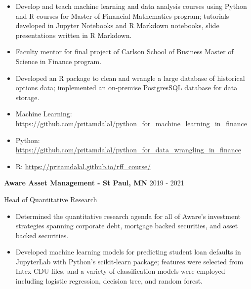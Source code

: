 \documentclass[11pt,a4paper,]{awesome-cv}
\begin{document}
\begin{itemize}
\item
  Develop and teach machine learning and data analysis courses using
  Python and R courses for Master of Financial Mathematics program;
  tutorials developed in Jupyter Notebooks and R Markdown notebooks,
  slide presentations written in R Markdown. \vspace{-0.5ex}
\item
  Faculty mentor for final project of Carlson School of Business Master
  of Science in Finance program. \vspace{-0.5ex}
\item
  Developed an R package to clean and wrangle a large database of
  historical options data; implemented an on-premise PostgresSQL
  database for data storage. \vspace{-0.5ex}
\item
  Machine Learning:
  \href{https://github.com/pritamdalal/python\_for\_machine\_learning\_in\_finance}{https://github.com/pritamdalal/python\_for\_machine\_learning\_in\_finance}
  \vspace{-0.5ex}
\item
  Python:
  \href{https://github.com/pritamdalal/python\_for\_data\_wrangling\_in\_finance}{https://github.com/pritamdalal/python\_for\_data\_wrangling\_in\_finance}
  \vspace{-0.5ex}
\item
  R:
  \href{https://pritamdalal.github.io/rff\_course/}{https://pritamdalal.github.io/rff\_course/}
  \vspace{-0.5ex}
\end{itemize}

\normalsize

\textbf{Aware Asset Management - St Paul, MN} \hfill 2019 - 2021

\vspace{-1ex}

Head of Quantitative Research

\vspace{-1.5ex}

\small

\begin{itemize}
\item
  Determined the quantitative research agenda for all of Aware's
  investment strategies spanning corporate debt, mortgage backed
  securities, and asset backed securities. \vspace{-0.5ex}
\item
  Developed machine learning models for predicting student loan defaults
  in JupyterLab with Python's scikit-learn package; features were
  selected from Intex CDU files, and a variety of classification models
  were employed including logistic regression, decision tree, and random
  forest. \vspace{-2ex}
\end{itemize}
\end{document}
